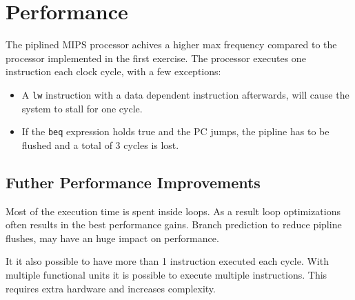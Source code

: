 \section{Performance}
The piplined MIPS processor achives a higher max frequency compared to the processor implemented in the first exercise.
The processor executes one instruction each clock cycle, with a few exceptions:

\begin{itemize}
\item A \texttt{lw} instruction with a data dependent instruction afterwards, will cause the system to stall for one cycle.
\item If the \texttt{beq} expression holds true and the PC jumps, the pipline has to be flushed and a total of 3 cycles is lost.
\end{itemize}

\subsection{Futher Performance Improvements}
Most of the execution time is spent inside loops.
As a result loop optimizations often results in the best performance gains.
Branch prediction to reduce pipline flushes, may have an huge impact on performance.


It it also possible to have more than 1 instruction executed each cycle.
With multiple functional units it is possible to execute multiple instructions.
This requires extra hardware and increases complexity.
